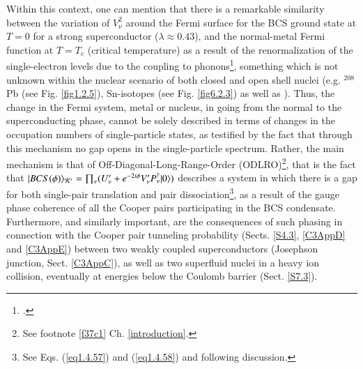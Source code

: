 Within this context, one can mention that there is a remarkable similarity between the variation of $V^2_\nu$ around the Fermi surface for the BCS ground state at $T=0$ for a strong superconductor ($\lambda\approx0.43$), and the normal-metal Fermi function at $T=T_c$ (critical temperature) as a result of the renormalization of the single-electron levels due to the coupling to phonons\footnote{\cite{Tinkham:96}.}, something which is not unknown within the nuclear scenario of both closed and  open shell nuclei (e.g. $^{208}$Pb (see Fig. \ref{fig1.2.5}), Sn-isotopes (see Fig. \ref{fig6.2.3}) as well as \cite{Idini:13,Idini:15}). Thus, the change in the Fermi system, metal or nucleus, in going from the normal to the superconducting phase, cannot be solely described in terms of changes in the occupation numbers of single-particle states, as testified by the fact that through this mechanism no gap opens in the single-particle spectrum. Rather, the main mechanism is that of Off-Diagonal-Long-Range-Order (ODLRO)\footnote{See footnote \ref{f37c1} Ch. \ref{introduction}.}, that is the fact that $|{BCS(\phi)} \rangle_{\mathcal K'}=\prod_\nu(U'_\nu+e^{-2i\phi}V'_\nu P^\dagger_\nu|{0} \rangle)$ describes a system in which there is a gap for both single-pair translation and pair dissociation\footnote{See Eqs. (\ref{eq1.4.57}) and (\ref{eq1.4.58}) and following discussion.}, as a result of the gauge phase coherence of all the Cooper pairs participating in the BCS condensate. Furthermore, and similarly important, are the consequences of such phasing in connection with the Cooper pair tunneling probability (Sects. \ref{S4.3}, \ref{C3AppD} and \ref{C3AppE}) between two weakly coupled superconductors (Josephson junction, Sect. \ref{C3AppC}), as well as two superfluid nuclei in a heavy ion collision, eventually at energies below the Coulomb barrier (Sect. \ref{S7.3}).




